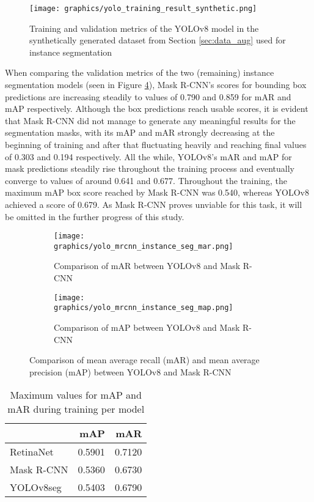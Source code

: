 \documentclass[draft,final]{vutinfth} %
\begin{document}
\begin{appendix}
\begin{figure}
    \centering
    \texttt{[image: graphics/yolo\_training\_result\_synthetic.png]}
    \caption{Training and validation metrics of the YOLOv8 model in the synthetically generated dataset from Section \ref{sec:data_aug} used for instance segmentation}
    \label{fig:yolo_training_metrics_synthetic}
\end{figure}

When comparing the validation metrics of the two (remaining) instance segmentation models (seen in Figure \ref{fig:yolo_mrcnn_instance_seg}), Mask R-CNN's scores for bounding box predictions are increasing steadily to values of 0.790 and 0.859 for mAR and mAP respectively. Although the box predictions reach usable scores, it is evident that Mask R-CNN did not manage to generate any meaningful results for the segmentation masks, with its mAP and mAR strongly decreasing at the beginning of training and after that fluctuating heavily and reaching final values of 0.303 and 0.194 respectively. All the while, YOLOv8's mAR and mAP for mask predictions steadily rise throughout the training process and eventually converge to values of around 0.641 and 0.677. Throughout the training, the maximum mAP box score reached by Mask R-CNN was 0.540, whereas YOLOv8 achieved a score of 0.679. As Mask R-CNN proves unviable for this task, it will be omitted in the further progress of this study.


\begin{figure}[]
    \centering
    \begin{subfigure}{0.48\textwidth}
        \texttt{[image: graphics/yolo\_mrcnn\_instance\_seg\_mar.png]}
        \caption{Comparison of mAR between YOLOv8 and Mask R-CNN}
        \label{fig:yolo_mrcnn_instance_seg_mar}
    \end{subfigure}
    \hfill
    \begin{subfigure}{0.48\textwidth}
        \texttt{[image: graphics/yolo\_mrcnn\_instance\_seg\_map.png]}
        \caption{Comparison of mAP between YOLOv8 and Mask R-CNN}
        \label{fig:yolo_mrcnn_instance_seg_map}
    \end{subfigure}
    \caption{Comparison of mean average recall (mAR) and mean average precision (mAP) between YOLOv8 and Mask R-CNN}
    \label{fig:yolo_mrcnn_instance_seg}
\end{figure}

\begin{table}[]
    \centering
    \begin{tabular}{lrr}
        \toprule
        & mAP & mAR \\
        \midrule
        RetinaNet & 0.5901 &  0.7120 \\
        Mask R-CNN & 0.5360 &  0.6730 \\
        YOLOv8seg & 0.5403  & 0.6790 \\
        \bottomrule
    \end{tabular}
    \caption{Maximum values for mAP and mAR during training per model}
    \label{tab:instance_segmentation_max_values}
\end{table}



\end{appendix}
\end{document}
